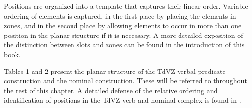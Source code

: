 \documentclass[output=paper]{langscibook}
\begin{document}
Positions are organized into a template that captures their linear order. Variable ordering of elements is captured, in the first place by placing the elements in zones, and in the second place by allowing elements to occur in more than one position in the planar structure if it is necessary. A more detailed exposition of the distinction between slots and zones can be found in the introduction of this book.

Tables 1 and 2 present the planar structure of the TdVZ verbal predicate construction and the nominal construction. These will be referred to throughout the rest of this chapter. A detailed defense of the relative ordering and identification of positions in the TdVZ verb and nominal complex is found in \citet{ambrociogrammar}. %
\end{document}
